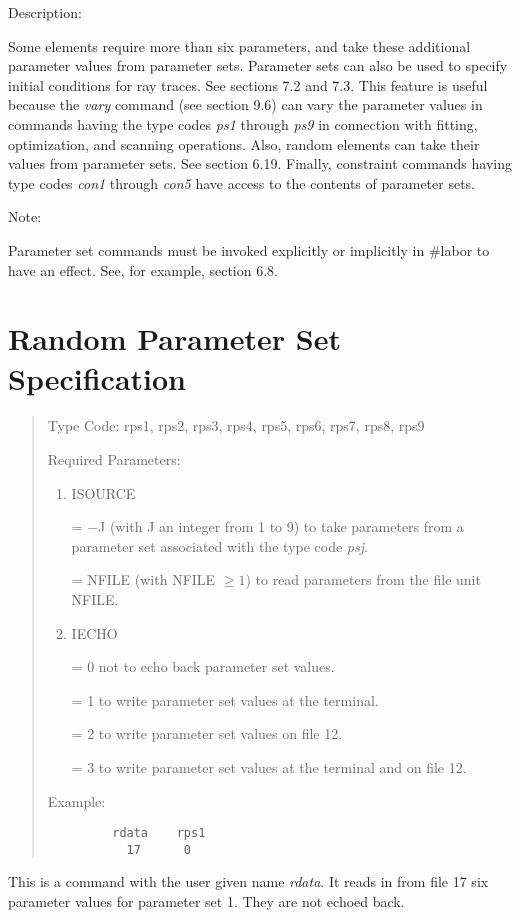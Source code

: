 \vspace{5mm}
     Description:
\vspace{2mm}

Some elements require more than six parameters, and take these additional
parameter values from parameter sets.  Parameter sets can also be used to
specify initial conditions for ray traces.  See sections 7.2 and 7.3.  This
feature is useful because the {\em vary} command (see section 9.6) can vary
the parameter values in commands having the type codes {\em ps1} through
{\em ps9} in connection with fitting, optimization, and
scanning operations.  Also, random elements can take their values from parameter
sets.  See section 6.19.  Finally, constraint commands having type codes
{\em con1} through {\em con5} have access to the contents of parameter
sets.

\vspace{5mm}
Note:
\vspace{2mm}

Parameter set commands must be invoked explicitly or
implicitly in \#labor to have an effect.  See, for example, section 6.8.

\newpage
\section{Random Parameter Set Specification}
\begin{quotation}
\noindent     Type Code:  rps1, rps2, rps3, rps4, rps5, rps6, rps7, rps8, rps9
\vspace{5mm}

\noindent Required Parameters: 
\begin{enumerate}
      \item  ISOURCE

             = $-$J (with J an integer from 1 to 9) to take parameters from a
               parameter \hspace*{1em}set associated with the type code {\em psj}.

             = NFILE (with NFILE $\geq 1$) to read parameters from the file unit NFILE.

      \item  IECHO

             = 0 not to echo back parameter set values.

             = 1 to write parameter set values at the terminal.

             = 2 to write parameter set values on file 12.

             = 3 to write parameter set values at the terminal and on
			 file 12.
\end{enumerate}

\vspace{5mm}
\noindent Example:
\begin{verbatim}
         rdata    rps1
           17      0
\end{verbatim}
\end{quotation}
This is a command with the user given name {\em rdata}.  It reads in from
file 17 six parameter values for parameter set 1.  They are not echoed
back.

